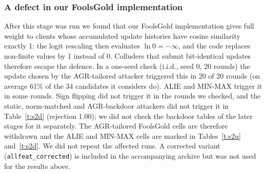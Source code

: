 \documentclass[conference]{IEEEtran}
\begin{document}
\subsubsection{A defect in our FoolsGold implementation}\label{sec:fgdefect}
After this stage was run we found that our FoolsGold implementation gives full weight to clients whose accumulated update histories have cosine similarity exactly 1: the logit rescaling then evaluates $\ln 0=-\infty$, and the code replaces non-finite values by 1 instead of 0. Colluders that submit bit-identical updates therefore escape the defence. In a one-seed check (i.i.d., seed 0, 20 rounds) the update chosen by the AGR-tailored attacker triggered this in 20 of 20 rounds (on average 61\% of the 34 candidates it considers do). ALIE and MIN-MAX trigger it in some rounds. Sign flipping did not trigger it in the rounds we checked, and the static, norm-matched and AGR-backdoor attackers did not trigger it in Table~\ref{t:s2d} (rejection 1.00); we did not check the backdoor tables of the later stages for it separately. The AGR-tailored FoolsGold cells are therefore withdrawn and the ALIE and MIN-MAX cells are marked in Tables~\ref{t:s2u} and~\ref{t:s2d}. We did not repeat the affected runs. A corrected variant (\texttt{allfeat\_corrected}) is included in the accompanying archive but was not used for the results above.
\end{document}
